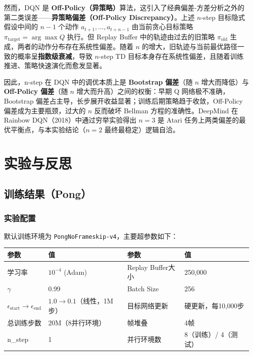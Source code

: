 \documentclass{article}
\begin{document}
然而，DQN 是 \textbf{Off-Policy（异策略）}算法，这引入了经典偏差-方差分析之外的第二类误差——\textbf{异策略偏差（Off-Policy Discrepancy）}。上述 $n$-step 目标隐式假设中间的 $n-1$ 个动作 $a_{t+1},\ldots,a_{t+n-1}$ 由当前贪心目标策略 $\pi_{\mathrm{target}} = \arg\max Q$ 执行。但 Replay Buffer 中的轨迹由过去的旧策略 $\pi_{\mathrm{old}}$ 生成，两者的动作分布存在系统性偏差。随着 $n$ 的增大，旧轨迹与当前最优路径一致的概率呈\textbf{指数级衰减}，导致 $n$-step TD 目标本身存在系统性偏差，且随着训练推进、策略快速演化而愈发显著。

因此，n-step 在 DQN 中的调优本质上是 \textbf{Bootstrap 偏差}（随 $n$ 增大而降低）与 \textbf{Off-Policy 偏差}（随 $n$ 增大而升高）之间的权衡：早期 Q 网络极不准确，Bootstrap 偏差占主导，长步展开收益显著；训练后期策略趋于收敛，Off-Policy 偏差成为主要瓶颈，过大的 $n$ 反而破坏 Bellman 方程的准确性。DeepMind 在 Rainbow DQN（2018）中通过穷举实验得出 $n=3$ 是 Atari 任务上两类偏差的最优平衡点，与本实验结论（$n=2$ 最终最稳定）逻辑自洽。

\section{实验与反思}

\subsection{训练结果（Pong）}

\subsubsection{实验配置}

默认训练环境为 \texttt{PongNoFrameskip-v4}，主要超参数如下：

\begin{center}
\begin{tabular}{ll|ll}
\toprule
参数 & 值 & 参数 & 值 \\
\midrule
学习率 & $10^{-4}$ (Adam) & Replay Buffer大小 & 250,000 \\
$\gamma$ & 0.99 & Batch Size & 256 \\
$\epsilon_{\text{start}} \to \epsilon_{\text{end}}$ & $1.0 \to 0.1$（线性，1M步） & 目标网络更新 & 硬更新，每10,000步 \\
总训练步数 & 20M（8并行环境） & 帧堆叠 & 4帧 \\
n\_step & 1 & 并行环境数 & 8（训练）/ 4（测试）\\
\bottomrule
\end{tabular}
\end{center}
\end{document}
